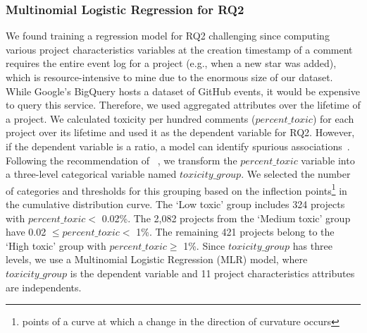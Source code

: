\subsubsection{Multinomial Logistic Regression for RQ2}
We found training a regression model for RQ2 challenging since computing various project characteristics variables at the creation timestamp of a comment requires the entire event log for a project (e.g., when a new star was added), which is resource-intensive to mine due to the enormous size of our dataset. While Google's BigQuery hosts a dataset of  GitHub events, it would be expensive to query this service. Therefore, we used aggregated attributes over the lifetime of a project. We calculated toxicity per hundred comments ($percent\_toxic$) for each project over its lifetime and used it as the dependent variable for RQ2. However,  if the dependent variable is a ratio, a model can identify spurious associations~\cite{richard-spurious}. 
Following the recommendation of ~\citet{long2006regression}, we transform the $percent\_toxic$ variable into a three-level categorical variable named $toxicity\_group$. 
We selected the number of categories and thresholds for this grouping based on the inflection points\footnote{points of a curve at which a change in the direction of curvature occurs} in the cumulative distribution curve.
The `Low toxic' group includes 324 projects with $percent\_toxic < $ 0.02\%. The 2,082 projects from the `Medium toxic' group have  0.02 $ \leq percent\_toxic < $ 1\%. The remaining 421 projects belong to the `High toxic' group with $percent\_toxic \geq $ 1\%. 
Since $ toxicity\_group$ has three levels, we use a Multinomial Logistic Regression (MLR) model, where $ toxicity\_group$ is the dependent variable and 11 project characteristics attributes are independents. 



